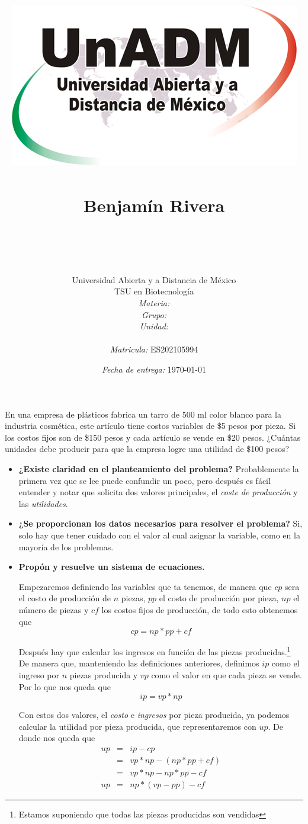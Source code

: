 \documentclass[12pt]{article}
\title{
	\includegraphics{../../../assets/logo-unadm} \\
	\ \\ Benjam\'in Rivera \\
	\bf{\titulo}\\\ \\}
\author{
	Universidad Abierta y a Distancia de México \\
	TSU en Biotecnolog\'ia \\
	\textit{Materia:} \materia \\
	\textit{Grupo:} \grupo \\
	\textit{Unidad:} \unidad \\
	\\
	\textit{Matricula:} ES202105994 }
\date{\textit{Fecha de entrega:} \today}
\begin{document}
\maketitle\newpage

\par En una empresa de plásticos fabrica un tarro de 500 ml color blanco para la industria cosmética, este artículo tiene costos variables de \$5 pesos por pieza. Si los costos fijos son de \$150 pesos y cada artículo se vende en \$20 pesos. ¿Cuántas unidades debe producir para que la empresa logre una utilidad de \$100 pesos?

	\begin{itemize}
		\item \textbf{¿Existe claridad en el planteamiento del problema?} Probablemente la primera vez que se lee puede confundir un poco, pero después es f\'acil entender y notar que solicita dos valores principales, el \textit{coste de producción} y las \textit{utilidades}.
		
		\item \textbf{¿Se proporcionan los datos necesarios para resolver el problema?} Si, solo hay que tener cuidado con el valor al cual asignar la variable, como en la mayor\'ia de los problemas.
		
		\item \textbf{Prop\'on y resuelve un sistema de ecuaciones.}
		\begin{multicols}{2}
			\par Empezaremos definiendo las variables que ta tenemos, de manera que $cp$ sera el costo de producci\'on de $n$ piezas, $pp$ el costo de producci\'on por pieza, $np$ el n\'umero de piezas y $cf$ los costos fijos de producci\'on, de todo esto obtenemos que
			$$ cp = np * pp + cf$$
			
			\par Despu\'es hay que calcular los ingresos en funci\'on de las piezas producidas.\footnote{Estamos suponiendo que todas las piezas producidas son vendidas} De manera que, manteniendo las definiciones anteriores, definimos $ip$ como el ingreso por $n$ piezas producida y $vp$ como el valor en que cada pieza se vende. Por lo que nos queda que
			$$ ip = vp * np $$
			
			\par Con estos dos valores, el \textit{costo} e \textit{ingresos} por pieza producida, ya podemos calcular la utilidad por pieza producida, que representaremos con $up$. De donde nos queda que
			\begin{eqnarray*}
				up &=& ip - cp \\
				&=& vp*np - (np * pp + cf) \\
				&=& vp*np - np*pp - cf \\
				up &=& np*(vp - pp) - cf
			\end{eqnarray*}
			

\end{multicols}
\end{itemize}
\end{document}

